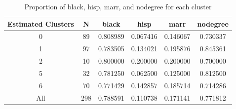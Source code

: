 \documentclass{article}
\begin{document}
\begin{appendices}
\begin{table}[H]
\centering
\label{tab:clusters}
\begin{tabular}{c|c|c|c|c|c}
\hline
\textbf{Estimated Clusters} & N &\textbf{black} & \textbf{hisp} & \textbf{marr} & \textbf{nodegree} \\ \hline
0 & 89 & 0.808989 & 0.067416 & 0.146067 & 0.730337 \\
1 & 97 & 0.783505 & 0.134021 & 0.195876 & 0.845361 \\
2 & 10 & 0.800000 & 0.200000 & 0.200000 & 0.700000 \\
5 & 32 & 0.781250 & 0.062500 & 0.125000 & 0.812500 \\
6 & 70 & 0.771429 & 0.142857 & 0.185714 & 0.714286 \\
\hline
All & 298 & 0.788591 & 0.110738 & 0.171141 & 0.771812  \\
\hline
\end{tabular}
\caption{Proportion of black, hisp, marr, and nodegree for each cluster}
\label{tab:nsw_cluster_covar_discrete}
\end{table}

\end{appendices}
\end{document}
